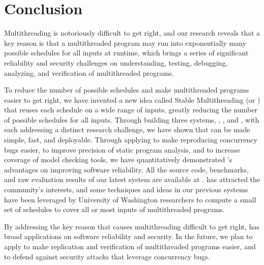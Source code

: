 \chapter{Conclusion} \label{sec:conclusion}

Multithreading is notoriously difficult to get right, and our research reveals
that a key reason is that a multithreaded program may run into exponentially 
many
possible schedules for all inputs at runtime, which brings a series of
significant reliability and security challenges on understanding,
testing, debugging, analyzing, and verification of multithreaded
programs.

To reduce the number of possible schedules and make multithreaded
programs easier to get right, we have invented a new idea called Stable
Multithreading (or \smt) that reuses each schedule on a wide range of inputs,
greatly reducing the number of possible schedules for all inputs. Through
building three \smt systems, \tern, \peregrine, and \parrot, with each 
addressing
a distinct research challenge, we have shown that \smt can be made simple, fast,
and deployable. Through applying \smt to make reproducing concurrency bugs
easier, to improve precision of static program analysis, and to increase
coverage of model checking tools, we have quantitatively demonstrated \smt's 
advantages on improving software reliability. All the source code,
benchmarks, and raw evaluation results of our latest \smt system \parrot are
available at \github. \smt has attracted the community's interests, and some 
techniques and ideas in our previous systems have been leveraged by 
University of Washington researchers to compute a small set of schedules to 
cover all or most inputs of multithreaded programs.

By addressing the key reason that causes multithreading difficult to get right,
\smt has broad applications on software reliability and security. In the 
future, we plan to apply \smt to make replication and verification of 
multithreaded programs easier, and to defend against security attacks 
that leverage concurrency bugs.